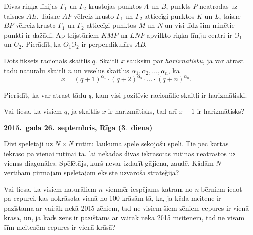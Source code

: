 \documentclass[11pt]{article}
\newcounter{alphnum}
\newenvironment{alphlist}{\begin{list}{(\Alph{alphnum})}{\usecounter{alphnum}\setlength{\leftmargin}{2.5em}} \rm}{\end{list}}
\begin{document}
\begin{problem}[BwTst2015.7]
Divas riņķa līnijas $\Gamma_1$ un $\Gamma_2$ krustojas punktos $A$ un $B$, punkts $P$ neatrodas uz taisnes $AB$. 
Taisne $AP$ vēlreiz krusto $\Gamma_1$ un $\Gamma_2$ attiecīgi punktos $K$ un $L$, taisne $BP$ vēlreiz krusto 
$\Gamma_1$ un $\Gamma_2$ attiecīgi punktos $M$ un $N$ un visi līdz šim minētie punkti ir dažādi. 
Ap trijstūriem $KMP$ un $LNP$ apvilkto riņķa līniju 
centri ir $O_1$ un $O_2$. Pierādīt, ka $O_1O_2$ ir perpendikulārs $AB$. 
\end{problem}

\begin{problem}[BwTst2015.8]
Dots fiksēts racionāls skaitlis $q$. Skaitli $x$ sauksim par {\em harizmātisku}, ja var atrast tādu naturālu 
skaitli $n$ un veselus skaitļus $\alpha_1, \alpha_2, \ldots, \alpha_n$, ka 
\[ x = (q + 1)^{\alpha_1} \cdot (q+2)^{\alpha_2} \cdot \ldots \cdot (q + n)^{\alpha_n}. \]
\begin{alphlist}
\item Pierādīt, ka var atrast tādu $q$, kam visi pozitīvie racionālie skaitļi ir harizmātiski. 
\item Vai tiesa, ka visiem $q$, ja skaitlis $x$ ir harizmātisks, tad arī $x + 1$ ir harizmātisks?
\end{alphlist}
\end{problem}


\begin{center}
{\bf 2015.\ gada 26.\ septembris, Rīga (3.\ diena)}
\end{center}

\begin{problem}[BwTst2015.9]
Divi spēlētāji uz $N \times N$ rūtiņu laukuma spēlē sekojošu spēli. Tie pēc kārtas iekrāso pa vienai rūtiņai tā, 
lai nekādas divas iekrāsotās rūtiņas neatrastos uz vienas diagonāles. Spēlētājs, kurš nevar izdarīt
gājienu, zaudē. Kādām $N$ vērtībām pirmajam spēlētājam eksistē uzvaroša stratē\v{g}ija?
\end{problem}


\begin{problem}[BwTst2015.10]
Vai tiesa, ka visiem naturāliem $n$ vienmēr iespējams katram no $n$ bērniem iedot pa cepurei, kas 
nokrāsota vienā no 100 krāsām tā, ka, ja kāda meitene ir pazīstama ar vairāk nekā 2015 zēniem, tad 
ne visiem šiem zēniem cepures ir vienā krāsā, un, ja kāds zēns ir pazīštams ar vairāk nekā 2015 meitenēm, 
tad ne visām šīm meitenēm cepures ir vienā krāsā?
\end{problem}
\end{document}
